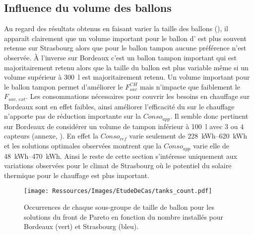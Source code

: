 \subsection{Influence du volume des ballons} %
\label{sub:influence_du_volume_des_ballons}
Au regard des résultats obtenus en faisant varier la taille des ballons
(), il apparaît clairement que un volume important
pour le ballon d’ est plus souvent retenue sur Strasbourg alors que pour le
ballon tampon aucune préférence n’est observée. À l’inverse sur Bordeaux c’est un ballon
tampon important qui est majoritairement retenu alors que la taille du ballon 
est plus variable même si un volume supérieur à \SI{300}{\litre} est majoritairement
retenu. Un volume important pour le ballon tampon permet d’améliorer le $F_{sav}^{CH}$
mais n’impacte que faiblement le $F_{sav,\, ext}$. Les consommations nécessaires pour
couvrir les besoins en chauffage sur Bordeaux sont en effet faibles, ainsi améliorer
l’efficacité du  sur le chauffage n’apporte pas de réduction importante sur la
$Conso_{app}$. Il semble donc pertinent sur Bordeaux de considérer un volume de tampon
inférieur à \SI{100}{\litre} avec $3$ ou $4$ capteurs (annexe, ).
En effet la $Conso_{ref}$ varie seulement de \SIrange{228}{620}{kWh} et les solutions
optimales observées montrent que la $Conso_{app}$ varie elle de \SIrange{48}{470}{kWh}. Ainsi le
reste de cette section s’intéresse uniquement aux variations observées pour le climat de
Strasbourg où le potentiel du solaire thermique pour le chauffage est plus important.

\begin{figure}
    \centering
    \texttt{[image: Ressources/Images/EtudeDeCas/tanks\_count.pdf]}
    \caption[Occurrences de chaque sous-groupe de taille de ballon pour les solutions du front de Pareto]
             {Occurrences de chaque sous-groupe de taille de ballon pour les solutions du front de Pareto
              en fonction du nombre installés pour Bordeaux (vert) et Strasbourg (bleu).}
    \label{fig:occurence_taille_ballons}
\end{figure}

